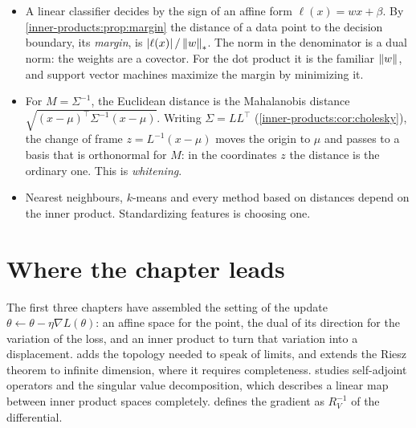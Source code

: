 \begin{notechapter}
\begin{mlthread}
\begin{itemize}[nosep]
  \item A linear classifier decides by the sign of an affine form
        $\ell(x) = wx + \beta$. By \cref{inner-products:prop:margin} the
        distance of a data point to the decision boundary, its
        \emph{margin}, is $\left|\ell(x)\right|/\left\|w\right\|_*$. The norm in the
        denominator is a dual norm: the weights are a covector. For the
        dot product it is the familiar $\left\|w\right\|$, and support vector
        machines maximize the margin by minimizing it.
  \item For $M = \Sigma^{-1}$, the Euclidean distance is the Mahalanobis
        distance $\sqrt{(x - \mu)^\top\Sigma^{-1}(x - \mu)}$. Writing
        $\Sigma = LL^\top$ (\cref{inner-products:cor:cholesky}), the
        change of frame $z = L^{-1}(x - \mu)$ moves the origin to $\mu$
        and passes to a basis that is orthonormal for $M$: in the
        coordinates $z$ the distance is the ordinary one. This is
        \emph{whitening}.
  \item Nearest neighbours, $k$-means and every method based on distances
        depend on the inner product. Standardizing features is choosing
        one.
\end{itemize}
\end{mlthread}

\section{Where the chapter leads}\label{inner-products:sec:outlook}

The first three chapters have assembled the setting of the update
$\theta\leftarrow\theta - \eta\nabla L(\theta)$: an affine space for the
point, the dual of its direction for the variation of the loss, and an
inner product to turn that variation into a displacement.
 adds the topology needed to speak of limits, and
extends the Riesz theorem to infinite dimension, where it requires
completeness.  studies self-adjoint operators and
the singular value decomposition, which describes a linear map between
inner product spaces completely.  defines the
gradient as $R_V^{-1}$ of the differential.


\end{notechapter}
